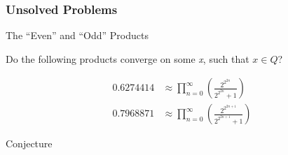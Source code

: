 \documentclass{beamer}
\begin{document}
\begin{frame}
\frametitle{Unsolved Problems}
\begin{alertblock}
{The ``Even'' and ``Odd'' Products}

Do the following products converge on some \emph x, such that \(x \in Q\)?

\begin{equation}
\begin{aligned}
0.6274414 &\approx \prod_{n=0}^\infty \left ( \frac{2^{2^{2n}}}{2^{2^{2n}} + 1} \right )\\
0.7968871 &\approx \prod_{n=0}^\infty \left ( \frac{2^{2^{2n+1}}}{2^{2^{2n+1}} + 1} \right )
\end{aligned}
\end{equation}

\end{alertblock}

\begin{block}
{Conjecture}



\end{block}

\end{frame}

\begin{frame}
\frametitle{}
\begin{block}
{}

\end{block}
\end{frame}

\begin{frame}
\frametitle{}
\begin{block}
{}

\end{block}
\end{frame}

%
%
\end{document}
